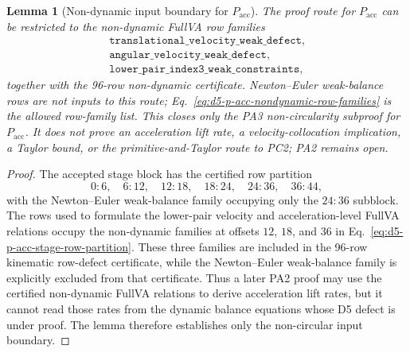 \documentclass[preprint,12pt]{elsarticle}
\newtheorem{lemma}{Lemma}
\begin{document}
\begin{lemma}[Non-dynamic input boundary for \(P_{\mathrm{acc}}\)]
\label{lem:d5-p-acc-independence}
The proof route for \(P_{\mathrm{acc}}\) can be restricted to the
non-dynamic FullVA row families
\begin{equation}
\label{eq:d5-p-acc-nondynamic-row-families}
\begin{gathered}
\texttt{translational\_velocity\_weak\_defect},\\
\texttt{angular\_velocity\_weak\_defect},\\
\texttt{lower\_pair\_index3\_weak\_constraints},
\end{gathered}
\end{equation}
together with the 96-row non-dynamic certificate.  Newton--Euler
weak-balance rows are not inputs to this route; Eq.~\eqref{eq:d5-p-acc-nondynamic-row-families}
is the allowed row-family list.  This closes only the PA3
non-circularity subproof for \(P_{\mathrm{acc}}\). It does not prove an
acceleration lift rate, a velocity-collocation implication, a Taylor bound,
or the primitive-and-Taylor route to PC2; PA2 remains open.
\end{lemma}

\begin{proof}
The accepted stage block has the certified row partition
\begin{equation}
\label{eq:d5-p-acc-stage-row-partition}
0{:}6,\quad 6{:}12,\quad 12{:}18,\quad 18{:}24,\quad
24{:}36,\quad 36{:}44,
\end{equation}
with the Newton--Euler weak-balance family occupying only the \(24{:}36\)
subblock.  The rows used to formulate the lower-pair velocity and
acceleration-level FullVA relations occupy the non-dynamic families at
offsets \(12\), \(18\), and \(36\) in Eq.~\eqref{eq:d5-p-acc-stage-row-partition}.
These three families are included in
the 96-row kinematic row-defect certificate, while the Newton--Euler
weak-balance family is explicitly excluded from that certificate.  Thus a
later PA2 proof may use the certified non-dynamic FullVA relations to derive
acceleration lift rates, but it cannot read those rates from the dynamic
balance equations whose D5 defect is under proof.  The lemma therefore
establishes only the non-circular input boundary.
\end{proof}
\end{document}
